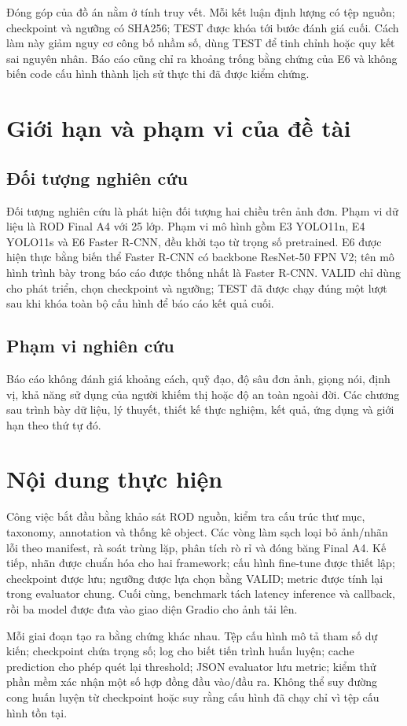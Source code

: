 \documentclass[12pt,a4paper,oneside]{report}
\begin{document}
Đóng góp của đồ án nằm ở tính truy vết. Mỗi kết luận định lượng có tệp nguồn; checkpoint và ngưỡng có SHA256; TEST được khóa tới bước đánh giá cuối. Cách làm này giảm nguy cơ công bố nhầm số, dùng TEST để tinh chỉnh hoặc quy kết sai nguyên nhân. Báo cáo cũng chỉ ra khoảng trống bằng chứng của E6 và không biến code cấu hình thành lịch sử thực thi đã được kiểm chứng.

\section{Giới hạn và phạm vi của đề tài}
\subsection{Đối tượng nghiên cứu}
Đối tượng nghiên cứu là phát hiện đối tượng hai chiều trên ảnh đơn. Phạm vi dữ liệu là ROD Final A4 với 25 lớp. Phạm vi mô hình gồm E3 YOLO11n, E4 YOLO11s và E6 Faster R-CNN, đều khởi tạo từ trọng số pretrained. E6 được hiện thực bằng biến thể Faster R-CNN có backbone ResNet-50 FPN V2; tên mô hình trình bày trong báo cáo được thống nhất là Faster R-CNN. VALID chỉ dùng cho phát triển, chọn checkpoint và ngưỡng; TEST đã được chạy đúng một lượt sau khi khóa toàn bộ cấu hình để báo cáo kết quả cuối.

\subsection{Phạm vi nghiên cứu}
Báo cáo không đánh giá khoảng cách, quỹ đạo, độ sâu đơn ảnh, giọng nói, định vị, khả năng sử dụng của người khiếm thị hoặc độ an toàn ngoài đời. Các chương sau trình bày dữ liệu, lý thuyết, thiết kế thực nghiệm, kết quả, ứng dụng và giới hạn theo thứ tự đó.


\section{Nội dung thực hiện}
Công việc bắt đầu bằng khảo sát ROD nguồn, kiểm tra cấu trúc thư mục, taxonomy, annotation và thống kê object. Các vòng làm sạch loại bỏ ảnh/nhãn lỗi theo manifest, rà soát trùng lặp, phân tích rò rỉ và đóng băng Final A4. Kế tiếp, nhãn được chuẩn hóa cho hai framework; cấu hình fine-tune được thiết lập; checkpoint được lưu; ngưỡng được lựa chọn bằng VALID; metric được tính lại trong evaluator chung. Cuối cùng, benchmark tách latency inference và callback, rồi ba model được đưa vào giao diện Gradio cho ảnh tải lên.

Mỗi giai đoạn tạo ra bằng chứng khác nhau. Tệp cấu hình mô tả tham số dự kiến; checkpoint chứa trọng số; log cho biết tiến trình huấn luyện; cache prediction cho phép quét lại threshold; JSON evaluator lưu metric; kiểm thử phần mềm xác nhận một số hợp đồng đầu vào/đầu ra. Không thể suy đường cong huấn luyện từ checkpoint hoặc suy rằng cấu hình đã chạy chỉ vì tệp cấu hình tồn tại.
\end{document}
